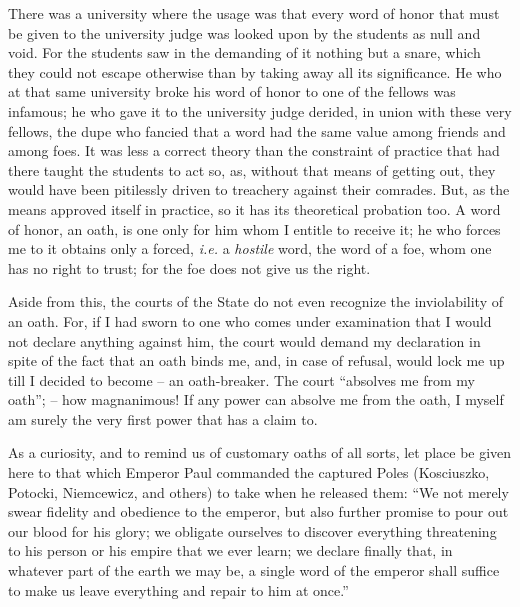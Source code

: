 There was a university where the usage was that every word of honor that must 
be given to the university judge was looked upon by the students as null and 
void. For the students saw in the demanding of it nothing but a snare, which 
they could not escape otherwise than by taking away all its significance. He 
who at that same university broke his word of honor to one of the fellows was 
infamous; he who gave it to the university judge derided, in union with these 
very fellows, the dupe who fancied that a word had the same value among 
friends and among foes. It was less a correct theory than the constraint of 
practice that had there taught the students to act so, as, without that means 
of getting out, they would have been pitilessly driven to treachery against 
their comrades. But, as the means approved itself in practice, so it has its 
theoretical probation too. A word of honor, an oath, is one only for him whom 
I entitle to receive it; he who forces me to it obtains only a forced, 
\textit{i.e.} a \textit{hostile} word, the word of a foe, whom one has no 
right to trust; for the foe does not give us the right.

Aside from this, the courts of the State do not even recognize the 
inviolability of an oath. For, if I had sworn to one who comes under 
examination that I would not declare anything against him, the court would 
demand my declaration in spite of the fact that an oath binds me, and, in case 
of refusal, would lock me up till I decided to become -- an oath-breaker. The 
court ``absolves me from my oath''; -- how magnanimous! If any power can 
absolve me from the oath, I myself am surely the very first power that has a 
claim to.

As a curiosity, and to remind us of customary oaths of all sorts, let place be 
given here to that which Emperor Paul commanded the captured Poles 
(Kosciuszko, Potocki, Niemcewicz, and others) to take when he released them: 
``We not merely swear fidelity and obedience to the emperor, but also further 
promise to pour out our blood for his glory; we obligate ourselves to discover 
everything threatening to his person or his empire that we ever learn; we 
declare finally that, in whatever part of the earth we may be, a single word 
of the emperor shall suffice to make us leave everything and repair to him at 
once.''

\myhrule

